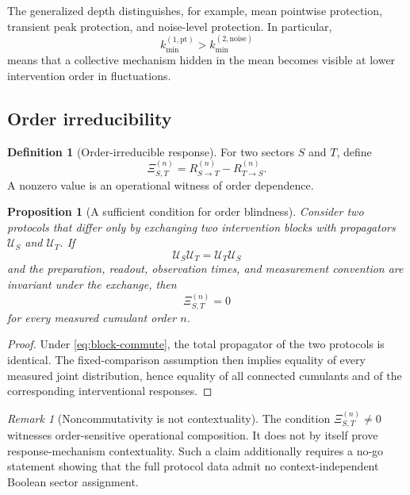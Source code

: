 \documentclass[11pt]{article}
\newtheorem{proposition}[theorem]{Proposition}
\theoremstyle{definition}
\newtheorem{definition}[theorem]{Definition}
\theoremstyle{remark}
\newtheorem{remark}[theorem]{Remark}
\newcommand{\cU}{\mathcal U}
\newcommand{\XiI}{\Xi}
\begin{document}
The generalized depth distinguishes, for example, mean pointwise protection, transient peak protection, and noise-level protection. In particular,
\begin{equation}
k_{\min}^{(1,\mathrm{pt})}>k_{\min}^{(2,\mathrm{noise})}
\end{equation}
means that a collective mechanism hidden in the mean becomes visible at lower intervention order in fluctuations.

\subsection{Order irreducibility}

\begin{definition}[Order-irreducible response]\label{def:order-response}
For two sectors $S$ and $T$, define
\begin{equation}
\boxed{
\XiI_{S,T}^{(n)}
 = R_{S\rightarrow T}^{(n)}-R_{T\rightarrow S}^{(n)}.
}
\label{eq:order-response}
\end{equation}
A nonzero value is an operational witness of order dependence.
\end{definition}

\begin{proposition}[A sufficient condition for order blindness]\label{prop:order-vanish}
Consider two protocols that differ only by exchanging two intervention blocks with propagators $\cU_S$ and $\cU_T$. If
\begin{equation}
\cU_S\cU_T=\cU_T\cU_S
\label{eq:block-commute}
\end{equation}
and the preparation, readout, observation times, and measurement convention are invariant under the exchange, then
\begin{equation}
\XiI_{S,T}^{(n)}=0
\end{equation}
for every measured cumulant order $n$.
\end{proposition}

\begin{proof}
Under \eqref{eq:block-commute}, the total propagator of the two protocols is identical. The fixed-comparison assumption then implies equality of every measured joint distribution, hence equality of all connected cumulants and of the corresponding interventional responses.
\end{proof}

\begin{remark}[Noncommutativity is not contextuality]
The condition $\XiI_{S,T}^{(n)}\neq0$ witnesses order-sensitive operational composition. It does not by itself prove response-mechanism contextuality. Such a claim additionally requires a no-go statement showing that the full protocol data admit no context-independent Boolean sector assignment.
\end{remark}
\end{document}
